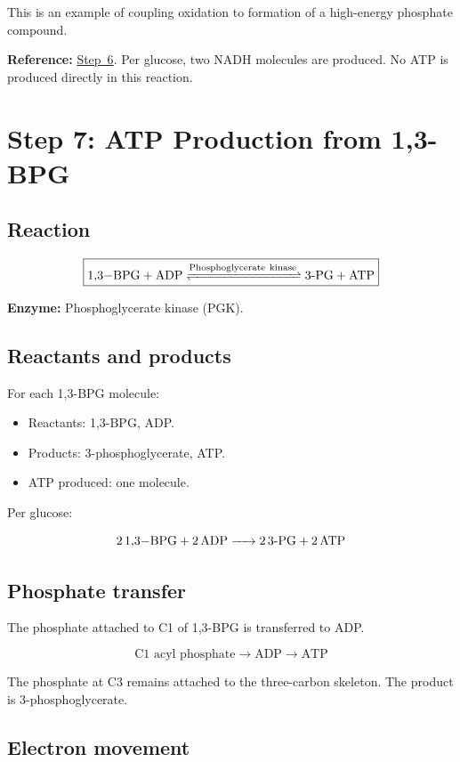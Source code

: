 \documentclass[11pt,a4paper]{article}
\newcommand{\stepref}[1]{\hyperref[step:#1]{Step~#1}}
\newcommand{\Enz}[1]{\textbf{Enzyme:} #1}
\newcommand{\Note}[1]{\par\smallskip
  \noindent\colorbox{gray!12}{
    \parbox{0.96\linewidth}{#1}
  }\par\smallskip}
\begin{document}
This is an example of coupling oxidation to formation of a
high-energy phosphate compound.

\Note{
\textbf{Reference:} \stepref{6}. Per glucose, two NADH molecules
are produced. No ATP is produced directly in this reaction.
}

\section{Step 7: ATP Production from 1,3-BPG}
\label{step:7}

\subsection{Reaction}

\[
\boxed{
\ce{
1,3-BPG + ADP
<=>[Phosphoglycerate\ kinase]
3-PG + ATP
}
}
\]

\Enz{Phosphoglycerate kinase (PGK).}

\subsection{Reactants and products}

For each 1,3-BPG molecule:

\begin{itemize}
  \item Reactants: 1,3-BPG, ADP.
  \item Products: 3-phosphoglycerate, ATP.
  \item ATP produced: one molecule.
\end{itemize}

Per glucose:

\[
\ce{
2 1,3-BPG + 2 ADP
-> 2 3-PG + 2 ATP
}
\]

\subsection{Phosphate transfer}

The phosphate attached to C1 of 1,3-BPG is transferred to ADP.

\[
\boxed{
\text{C1 acyl phosphate}
\longrightarrow
\text{ADP}
\longrightarrow
\text{ATP}
}
\]

The phosphate at C3 remains attached to the three-carbon skeleton.
The product is 3-phosphoglycerate.

\subsection{Electron movement}
\end{document}
